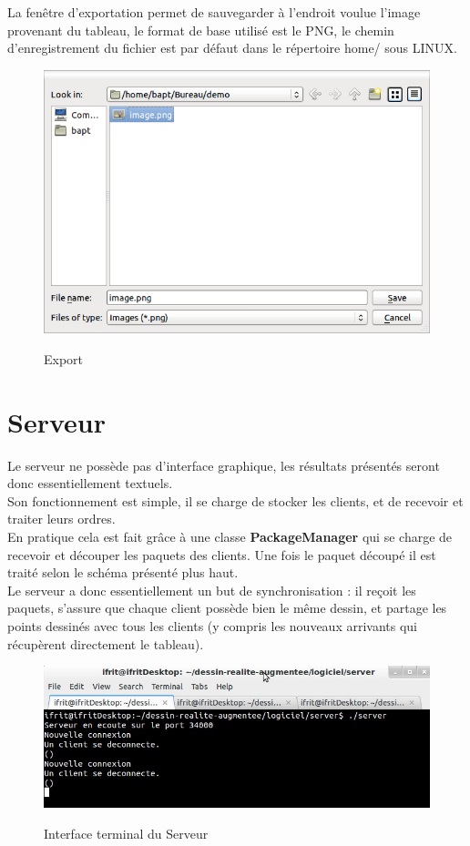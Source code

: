 \documentclass{report}
\begin{document}
				La fenêtre d'exportation permet de sauvegarder à l'endroit voulue l'image provenant du tableau, le format de base utilisé est le PNG, le chemin d'enregistrement du fichier est par défaut dans le répertoire home/ sous LINUX. \\
				\begin{figure}[!h]
						\centering
						\includegraphics[scale=0.4]{../images/export.png}\\
						\caption{Export}
						\label{Export}
				\end{figure}
				\newpage
		\section{Serveur} %
		Le serveur ne possède pas d'interface graphique, les résultats présentés seront donc essentiellement textuels. \\
		Son fonctionnement est simple, il se charge de stocker les clients, et de recevoir et traiter leurs ordres.\\
		En pratique cela est fait grâce à une classe \textbf{PackageManager} qui se charge de recevoir et découper les paquets des clients. Une fois le paquet découpé il est traité selon le schéma présenté plus haut. \\
		Le serveur a donc essentiellement un but de synchronisation : il reçoit les paquets, s'assure que chaque client possède bien le même dessin, et partage les points dessinés avec tous les clients (y compris les nouveaux arrivants qui récupèrent directement le tableau). \\
		\begin{figure}[!h]
						\centering
						\includegraphics[scale=0.6]{../images/captureServer.jpg}\\
						\caption{Interface terminal du Serveur}
						\label{Interface terminal du Serveur}
				\end{figure}
		\newpage
\end{document}
